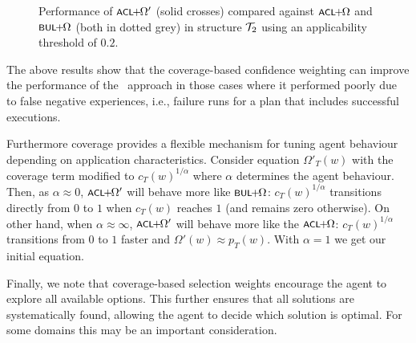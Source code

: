 \begin{figure}[t]
   \centering
   
   \caption{Performance of $\CLSELB$ (solid crosses) compared against $\CLSELA$ and $\BULSELA$ (both in dotted grey) in structure ${\mathcal{T}}_2$ using an applicability threshold of $0.2$.}
   \label{fig:performance-applicability}
\end{figure}


The above results show that the coverage-based confidence weighting
can improve the performance of the \CL\ approach in those
cases where it performed poorly due to false negative experiences,
i.e., failure runs for a plan that includes successful executions.
%

Furthermore coverage provides a flexible mechanism for tuning agent 
behaviour depending on application characteristics. Consider equation $\Omega'_T(w)$ with the coverage term modified to $c_T(w)^{1/\alpha}$ where $\alpha$ determines the agent behaviour. Then, as $\alpha \approx 0$, $\CLSELB$ will behave more
like $\BULSELA$: $c_T(w)^{1/\alpha}$ transitions directly from $0$
to $1$ when $c_T(w)$ reaches $1$ (and remains zero otherwise).
On other hand, when $\alpha \approx \infty$, $\CLSELB$ will behave more
like the $\CLSELA$: $c_T(w)^{1/\alpha}$ transitions from $0$ to $1$ faster and
$\Omega'(w) \approx p_T(w)$.
%
With $\alpha=1$ we get our initial equation.

Finally, we note that coverage-based selection weights encourage the agent to
explore all available options. This further ensures that all solutions are systematically 
found, allowing the agent to decide which solution is optimal. For some domains
this may be an important consideration.



